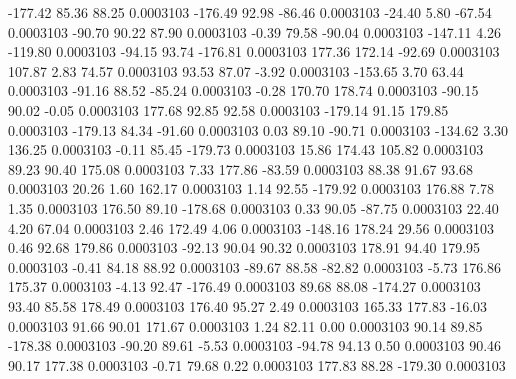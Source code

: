     -177.42       85.36       88.25     0.0003103
     -176.49       92.98      -86.46     0.0003103
      -24.40        5.80      -67.54     0.0003103
      -90.70       90.22       87.90     0.0003103
       -0.39       79.58      -90.04     0.0003103
     -147.11        4.26     -119.80     0.0003103
      -94.15       93.74     -176.81     0.0003103
      177.36      172.14      -92.69     0.0003103
      107.87        2.83       74.57     0.0003103
       93.53       87.07       -3.92     0.0003103
     -153.65        3.70       63.44     0.0003103
      -91.16       88.52      -85.24     0.0003103
       -0.28      170.70      178.74     0.0003103
      -90.15       90.02       -0.05     0.0003103
      177.68       92.85       92.58     0.0003103
     -179.14       91.15      179.85     0.0003103
     -179.13       84.34      -91.60     0.0003103
        0.03       89.10      -90.71     0.0003103
     -134.62        3.30      136.25     0.0003103
       -0.11       85.45     -179.73     0.0003103
       15.86      174.43      105.82     0.0003103
       89.23       90.40      175.08     0.0003103
        7.33      177.86      -83.59     0.0003103
       88.38       91.67       93.68     0.0003103
       20.26        1.60      162.17     0.0003103
        1.14       92.55     -179.92     0.0003103
      176.88        7.78        1.35     0.0003103
      176.50       89.10     -178.68     0.0003103
        0.33       90.05      -87.75     0.0003103
       22.40        4.20       67.04     0.0003103
        2.46      172.49        4.06     0.0003103
     -148.16      178.24       29.56     0.0003103
        0.46       92.68      179.86     0.0003103
      -92.13       90.04       90.32     0.0003103
      178.91       94.40      179.95     0.0003103
       -0.41       84.18       88.92     0.0003103
      -89.67       88.58      -82.82     0.0003103
       -5.73      176.86      175.37     0.0003103
       -4.13       92.47     -176.49     0.0003103
       89.68       88.08     -174.27     0.0003103
       93.40       85.58      178.49     0.0003103
      176.40       95.27        2.49     0.0003103
      165.33      177.83      -16.03     0.0003103
       91.66       90.01      171.67     0.0003103
        1.24       82.11        0.00     0.0003103
       90.14       89.85     -178.38     0.0003103
      -90.20       89.61       -5.53     0.0003103
      -94.78       94.13        0.50     0.0003103
       90.46       90.17      177.38     0.0003103
       -0.71       79.68        0.22     0.0003103
      177.83       88.28     -179.30     0.0003103
